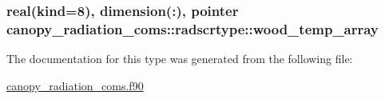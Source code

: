 \subsubsection[{\texorpdfstring{wood\+\_\+temp\+\_\+array}{wood_temp_array}}]{\setlength{\rightskip}{0pt plus 5cm}real(kind=8), dimension(\+:), pointer canopy\+\_\+radiation\+\_\+coms\+::radscrtype\+::wood\+\_\+temp\+\_\+array}\hypertarget{structcanopy__radiation__coms_1_1radscrtype_ab2c191fb2e19839b8465587f40b5329a}{}\label{structcanopy__radiation__coms_1_1radscrtype_ab2c191fb2e19839b8465587f40b5329a}


The documentation for this type was generated from the following file\+:\begin{DoxyCompactItemize}
\item 
\hyperlink{canopy__radiation__coms_8f90}{canopy\+\_\+radiation\+\_\+coms.\+f90}\end{DoxyCompactItemize}
